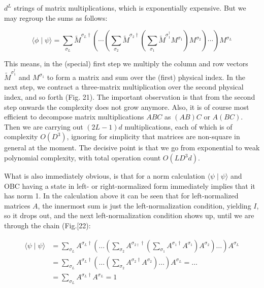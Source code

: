 \documentclass[12pt]{article}
\begin{document}
$d^{L}$ strings of matrix multiplications, which is exponentially expensive. But we may regroup the sums as follows:


\begin{equation*}
\langle\phi \mid \psi\rangle=\sum_{\sigma_{L}} \tilde{M}^{\sigma_{L} \dagger}\left(\cdots\left(\sum_{\sigma_{2}} \tilde{M}^{\sigma_{2} \dagger}\left(\sum_{\sigma_{1}} \tilde{M}^{\sigma_{1}^{\dagger}} M^{\sigma_{1}}\right) M^{\sigma_{2}}\right) \cdots\right) M^{\sigma_{L}} \tag{95}
\end{equation*}


This means, in the (special) first step we multiply the column and row vectors $\tilde{M}^{\sigma_{1}^{\dagger}}$ and $M^{\sigma_{1}}$ to form a matrix and sum over the (first) physical index. In the next step, we contract a three-matrix multiplication over the second physical index, and so forth (Fig. 21). The important observation is that from the second step onwards the complexity does not grow anymore. Also, it is of course most efficient to decompose matrix multiplications $A B C$ as $(A B) C$ or $A(B C)$. Then we are carrying out $(2 L-1) d$ multiplications, each of which is of complexity $O\left(D^{3}\right)$, ignoring for simplicity that matrices are non-square in general at the moment. The decisive point is that we go from exponential to weak polynomial complexity, with total operation count $O\left(L D^{3} d\right)$.

What is also immediately obvious, is that for a norm calculation $\langle\psi \mid \psi\rangle$ and OBC having a state in left- or right-normalized form immediately implies that it has norm 1. In the calculation above it can be seen that for left-normalized matrices $A$, the innermost sum is just the left-normalization condition, yielding $I$, so it drops out, and the next left-normalization condition shows up, until we are through the chain (Fig.[22):

$$
\begin{aligned}
\langle\psi \mid \psi\rangle & =\sum_{\sigma_{L}} A^{\sigma_{L} \dagger}\left(\ldots\left(\sum_{\sigma_{2}} A^{\sigma_{2 \dagger} \dagger}\left(\sum_{\sigma_{1}} A^{\sigma_{1} \dagger} A^{\sigma_{1}}\right) A^{\sigma_{2}}\right) \ldots\right) A^{\sigma_{L}} \\
& =\sum_{\sigma_{L}} A^{\sigma_{L} \dagger}\left(\ldots\left(\sum_{\sigma_{2}} A^{\sigma_{2} \dagger} A^{\sigma_{2}}\right) \ldots\right) A^{\sigma_{L}}=\ldots \\
& =\sum_{\sigma_{L}} A^{\sigma_{L} \dagger} A^{\sigma_{L}}=1
\end{aligned}
$$
\end{document}
